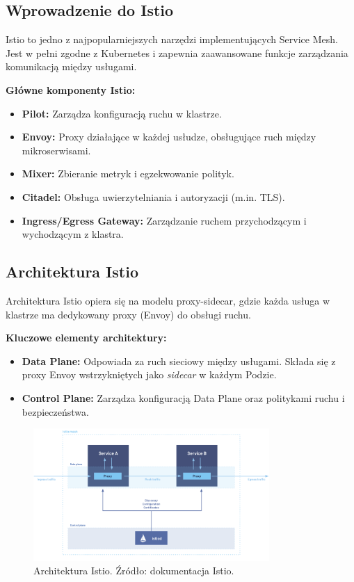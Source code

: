 \documentclass{article}
\begin{document}
\subsection{Wprowadzenie do Istio}

Istio to jedno z najpopularniejszych narzędzi implementujących Service Mesh. Jest w pełni zgodne z Kubernetes i zapewnia zaawansowane funkcje zarządzania komunikacją między usługami.

\textbf{Główne komponenty Istio:}
\begin{itemize}
    \item \textbf{Pilot:} Zarządza konfiguracją ruchu w klastrze.
    \item \textbf{Envoy:} Proxy działające w każdej usłudze, obsługujące ruch między mikroserwisami.
    \item \textbf{Mixer:} Zbieranie metryk i egzekwowanie polityk.
    \item \textbf{Citadel:} Obsługa uwierzytelniania i autoryzacji (m.in. TLS).
    \item \textbf{Ingress/Egress Gateway:} Zarządzanie ruchem przychodzącym i wychodzącym z klastra.
\end{itemize}

\subsection{Architektura Istio}

Architektura Istio opiera się na modelu proxy-sidecar, gdzie każda usługa w klastrze ma dedykowany proxy (Envoy) do obsługi ruchu.

\textbf{Kluczowe elementy architektury:}
\begin{itemize}
    \item \textbf{Data Plane:} Odpowiada za ruch sieciowy między usługami. Składa się z proxy Envoy wstrzykniętych jako \textit{sidecar} w każdym Podzie.
    \item \textbf{Control Plane:} Zarządza konfiguracją Data Plane oraz politykami ruchu i bezpieczeństwa.
\end{itemize}

\begin{figure}[h]
    \centering
    \includegraphics[width=0.8\textwidth]{resources/istio_architecture.png}
    \caption{Architektura Istio. Źródło: dokumentacja Istio.}
\end{figure}
\end{document}
